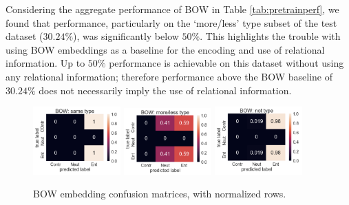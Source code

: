 Considering the aggregate performance of BOW in Table \ref{tab:pretrainperf}, we found that performance, particularly on the `more/less' type subset of the test dataset ($30.24\%$), was significantly below $50\%$. This highlights the trouble with using BOW embeddings as a baseline for the encoding and use of relational information. Up to $50\%$ performance is achievable on this dataset without using any relational information; therefore performance above the BOW baseline of $30.24\%$ does not necessarily imply the use of relational information.

\begin{figure}[ht!]
\centering
\includegraphics[width=0.30\textwidth]{figures/bow-same-large}
\includegraphics[width=0.30\textwidth]{figures/bow-ml-large-5}
\includegraphics[width=0.30\textwidth]{figures/bow-not-large-5}

\caption{BOW embedding confusion matrices, with normalized rows.}

\label{fig:BOWhist}
\end{figure}

